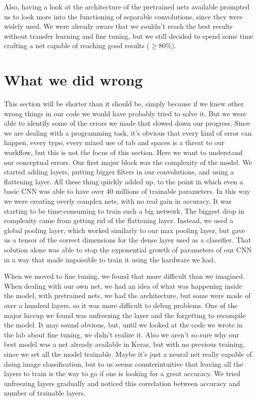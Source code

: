 \documentclass[a4paper,12pt]{article}
\numberwithin{equation}{section}
\begin{document}
Also, having a look at the architecture of the pretrained nets available prompted us to look more into the functioning of separable convolutions, since they were widely used. We were already aware that we couldn't reach the best results without transfer learning and fine tuning, but we still decided to spend some time crafting a net capable of reaching good results (\(\geq 80\%\)).
\section*{What we did wrong}
This section will be shorter than it should be, simply because if we knew other wrong things in our code we would have probably tried to solve it. But we were able to identify some of the errors we made that slowed down our progress. Since we are dealing with a programming task, it's obvious that every kind of error can happen, every typo, every mixed use of tab and spaces is a threat to our workflow, but this is not the focus of this section. Here we want to understand our conceptual errors. Our first major block was the complexity of the model. We started adding layers, putting bigger filters in our convolutions, and using a flattening layer. All these thing quickly added up, to the point in which even a basic CNN was able to have over \(40\) millions of trainable parameters. In this way we were creating overly complex nets, with no real gain in accuracy. It was starting to be time-consuming to train such a big network. The biggest drop in complexity came from getting rid of the flattening layer. Instead, we used a global pooling layer, which worked similarly to our max pooling layer, but gave us a tensor of the correct dimensions for the dense layer used as a classifier. That solution alone was able to stop the exponential growth of parameters of our CNN in a way that made impossible to train it using the hardware we had. 

When we moved to fine tuning, we found that more difficult than we imagined. When dealing with our own net, we had an idea of what was happening inside the model, with pretrained nets, we had the architecture, but some were made of over a hundred layers, so it was more difficult to debug problems. One of the major hiccup we found was unfreezing the layer and the forgetting to recompile the model. It may sound obvious, but, until we looked at the code we wrote in the lab about fine tuning, we didn't realize it. Also we aren't so sure why our best model was a net already available in Keras, but with no previous training, since we set all the model trainable. Maybe it's just a neural net really capable of doing image classification, but to us seems counterintuitive that leaving all the layers to train is the way to go if one is looking for a great accuracy. We tried unfreezing layers gradually and noticed this correlation between accuracy and number of trainable layers.
\end{document}
